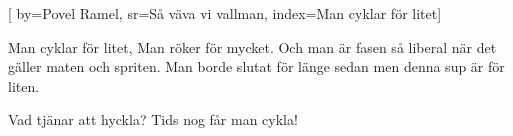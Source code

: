 [ 		
	by={Povel Ramel},					
	sr={Så väva vi vallman},					
	index={Man cyklar för litet}]		
	
\beginverse*						
Man cyklar för litet, 
Man röker för mycket.
Och man är fasen så liberal 
när det gäller maten och spriten. 
Man borde slutat för länge sedan
men denna sup är för liten. 
\endverse										

\beginverse*						
Vad tjänar att hyckla? 
Tids nog får man cykla! 
\endverse										

\endsong		

